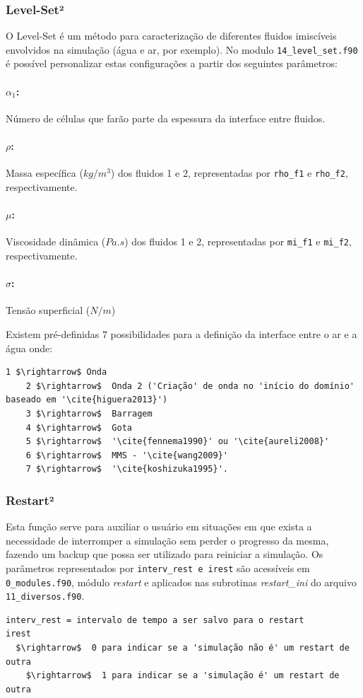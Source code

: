 \documentclass[12pt, a4paper]{article}
\begin{document}
\subsubsection{Level-Set²} \label{sub:levelset}
O Level-Set é um método para caracterização de diferentes fluidos imiscíveis envolvidos na simulação (água e ar, por exemplo). No modulo \verb|14_level_set.f90| é possível personalizar estas configurações a partir dos seguintes parâmetros:

\paragraph{$\alpha_1$:} Número de células que farão parte da espessura da interface entre fluidos.
\paragraph{$\rho$:} Massa específica ($kg/m^3$) dos fluidos 1 e 2, representadas por \verb|rho_f1| e \verb|rho_f2|, respectivamente.
\paragraph{$\mu$:} Viscosidade dinâmica ($Pa.s$) dos fluidos 1 e 2, representadas por \verb|mi_f1| e \verb|mi_f2|, respectivamente.
\paragraph{$\sigma$:} Tensão superficial ($N/m$)
\vspace{0.5cm}

Existem pré-definidas 7 possibilidades para a definição da interface entre o ar e a água onde:

\vspace{0.5cm}
\begin{lstlisting}[escapeinside='']
  1 $\rightarrow$ Onda 
	2 $\rightarrow$  Onda 2 ('Criação' de onda no 'início do domínio' baseado em '\cite{higuera2013}')
	3 $\rightarrow$  Barragem 
	4 $\rightarrow$  Gota 
	5 $\rightarrow$  '\cite{fennema1990}' ou '\cite{aureli2008}'
	6 $\rightarrow$  MMS - '\cite{wang2009}'
	7 $\rightarrow$  '\cite{koshizuka1995}'.
\end{lstlisting}

\subsubsection{Restart²}
Esta função serve para auxiliar o usuário em situações em que exista a necessidade de interromper a simulação sem perder o progresso da mesma, fazendo um backup que possa ser utilizado para reiniciar a simulação. Os parâmetros representados por \verb|interv_rest e irest| são acessíveis em \verb|0_modules.f90|, módulo \textit{restart} e aplicados nas subrotinas \textit{restart\_ini} do arquivo \verb|11_diversos.f90|.
\begin{lstlisting}[escapeinside='']
interv_rest = intervalo de tempo a ser salvo para o restart
irest	
  $\rightarrow$  0 para indicar se a 'simulação não é' um restart de outra
	$\rightarrow$  1 para indicar se a 'simulação é' um restart de outra
\end{lstlisting}
\end{document}
